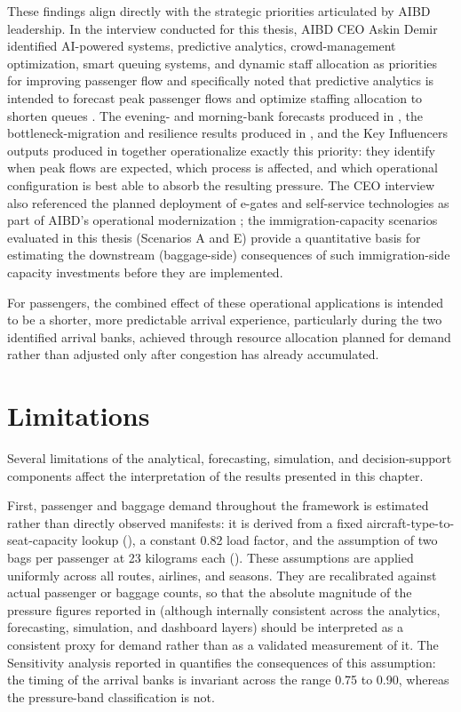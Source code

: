 These findings align directly with the strategic priorities articulated by AIBD leadership. In the interview conducted for this thesis, AIBD CEO Askin Demir identified AI-powered systems, predictive analytics, crowd-management optimization, smart queuing systems, and dynamic staff allocation as priorities for improving passenger flow and specifically noted that predictive analytics is intended to forecast peak passenger flows and optimize staffing allocation to shorten queues \parencite{demir2025speaker}. The evening- and morning-bank forecasts produced in , the bottleneck-migration and resilience results produced in , and the Key Influencers outputs produced in  together operationalize exactly this priority: they identify when peak flows are expected, which process is affected, and which operational configuration is best able to absorb the resulting pressure. The CEO interview also referenced the planned deployment of e-gates and self-service technologies as part of AIBD’s operational modernization \parencite{demir2025speaker}; the immigration-capacity scenarios evaluated in this thesis (Scenarios A and E) provide a quantitative basis for estimating the downstream (baggage-side) consequences of such immigration-side capacity investments before they are implemented.

For passengers, the combined effect of these operational applications is intended to be a shorter, more predictable arrival experience, particularly during the two identified arrival banks, achieved through resource allocation planned for demand rather than adjusted only after congestion has already accumulated.

\section{Limitations}
\label{sec:results-limitations}

Several limitations of the analytical, forecasting, simulation, and decision-support components affect the interpretation of the results presented in this chapter.

First, passenger and baggage demand throughout the framework is estimated rather than directly observed manifests: it is derived from a fixed aircraft-type-to-seat-capacity lookup (), a constant 0.82 load factor, and the assumption of two bags per passenger at 23 kilograms each (). These assumptions are applied uniformly across all routes, airlines, and seasons. They are recalibrated against actual passenger or baggage counts, so that the absolute magnitude of the pressure figures reported in  (although internally consistent across the analytics, forecasting, simulation, and dashboard layers) should be interpreted as a consistent proxy for demand rather than as a validated measurement of it. The Sensitivity analysis reported in  quantifies the consequences of this assumption: the timing of the arrival banks is invariant across the range 0.75 to 0.90, whereas the pressure-band classification is not.

